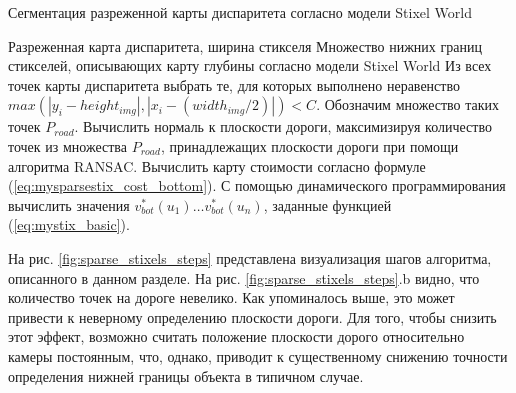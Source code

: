 \documentclass[aps,%
14pt,%
final,%
oneside,
onecolumn,%
musixtex, %
superscriptaddress,%
centertags]{extarticle} %
\begin{document}
\begin{algorithm}[H]
\caption{Сегментация разреженной карты диспаритета согласно модели Stixel World}
\label{alg:sparse_stixels}
\begin{algorithmic}[1]
\Require Разреженная карта диспаритета, ширина стикселя
\Ensure Множество нижних границ стикселей, описывающих карту глубины согласно модели Stixel World
\State Из всех точек карты диспаритета выбрать те, для которых выполнено неравенство $max(|y_i - height_{img}|, |x_i - (width_{img} / 2) |) < C$. Обозначим множество таких точек $P_{road}$.
\State Вычислить нормаль к плоскости дороги, максимизируя количество точек из множества $P_{road}$, принадлежащих плоскости дороги при помощи алгоритма RANSAC.
\State Вычислить карту стоимости согласно формуле (\ref{eq:mysparsestix_cost_bottom}).
\State С помощью динамического программирования вычислить значения $v_{bot}^*(u_1) \dots v_{bot}^*(u_n)$, заданные функцией (\ref{eq:mystix_basic}).
\end{algorithmic}
\end{algorithm}

На рис. \ref{fig:sparse_stixels_steps} представлена визуализация шагов алгоритма, описанного в данном разделе. На рис. \ref{fig:sparse_stixels_steps}.b видно, что количество точек на дороге невелико. Как упоминалось выше, это может привести к неверному определению плоскости дороги. Для того, чтобы снизить этот эффект, возможно считать положение плоскости дорого относительно камеры постоянным, что, однако, приводит к существенному снижению точности определения нижней границы объекта в типичном случае.
\end{document}
